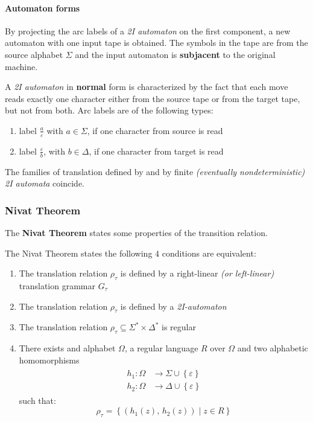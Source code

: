 \documentclass[english]{article}
\begin{document}
\paragraph{Automaton forms}

By projecting the arc labels of a \textit{2I automaton} on the first component, a new automaton with one input tape is obtained.
The symbols in the tape are from the source alphabet \(\Sigma\) and the input automaton is \textbf{subjacent} to the original machine.

A \textit{2I automaton} in \textbf{normal} form is characterized by the fact that each move reads exactly one character either from the source tape or from the target tape, but not from both.
Arc labels are of the following types:

\begin{enumerate}
  \item label \(\frac{a}{\varepsilon}\) with \(a \in \Sigma\), if one character from source is read
  \item label \(\frac{\varepsilon}{b}\), with \(b \in \Delta\), if one character from target is read
\end{enumerate}

\bigskip
The families of translation defined by \rte and by finite \textit{(eventually nondeterministic)} \textit{2I automata} coincide.

\subsubsection{Nivat Theorem}

The \textbf{Nivat Theorem} states some properties of the transition relation.

\begin{theorem}
  \label{theo:nivat-theorem}
  The Nivat Theorem states the following \(4\) conditions are equivalent:

  \begin{enumerate}
    \item The translation relation \(\rho_\tau\) is defined by a right-linear \textit{(or left-linear)} translation grammar \(G_\tau\)
    \item The translation relation \(\rho_\tau\) is defined by a \textit{2I-automaton}
    \item The translation relation \(\rho_\tau \subseteq \Sigma^\ast \times \Delta^\ast\) is regular
    \item There exists and alphabet \(\Omega\), a regular language \(R\) over \(\Omega\) and two alphabetic homomorphisms
          \begin{gather*}
            \begin{aligned}
              h_1 : \Omega & \rightarrow \Sigma \cup \left\{ \varepsilon \right\} \\
              h_2 : \Omega & \rightarrow \Delta \cup \left\{ \varepsilon \right\}
            \end{aligned}
          \end{gather*}
          such that:
          \[ \rho_\tau = \left\{ \left( h_1(z), \, h_2(z) \right) \mid z \in R \right\} \]
  \end{enumerate}
\end{theorem}
\end{document}
